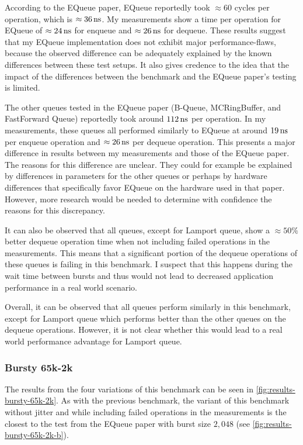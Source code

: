 According to the EQueue paper, EQueue reportedly took $\approx 60$ cycles per operation, which is
$\approx \SI{36}{\nano\second}$.
My measurements show a time per operation for EQueue of $\approx \SI{24}{\nano\second}$ for enqueue and
$\approx \SI{26}{\nano\second}$ for dequeue.
These results suggest that my EQueue implementation does not exhibit major performance-flaws, because the
observed difference can be adequately explained by the known differences between these test setups.
It also gives credence to the idea that the impact of the differences between the benchmark and the EQueue
paper's testing is limited.

The other queues tested in the EQueue paper (B-Queue, MCRingBuffer, and FastForward Queue) reportedly took
around $\SI{112}{\nano\second}$ per operation.
In my measurements, these queues all performed similarly to EQueue at around $\SI{19}{\nano\second}$ per enqueue operation
and $\approx \SI{26}{\nano\second}$ per dequeue operation.
This presents a major difference in results between my measurements and those of the EQueue paper.
The reasons for this difference are unclear.
They could for example be explained by differences in parameters for the other queues or perhaps by hardware
differences that specifically favor EQueue on the hardware used in that paper.
However, more research would be needed to determine with confidence the reasons for this discrepancy.

It can also be observed that all queues, except for Lamport queue, show a $\approx 50\%$ better dequeue
operation time when not including failed operations in the measurements.
This means that a significant portion of the dequeue operations of these queues is failing in this benchmark.
I suspect that this happens during the wait time between bursts and thus would not lead to decreased
application performance in a real world scenario.

Overall, it can be observed that all queues perform similarly in this benchmark, except for Lamport queue
which performs better than the other queues on the dequeue operations.
However, it is not clear whether this would lead to a real world performance advantage for Lamport queue.

\subsubsection{Bursty 65k-2k}
The results from the four variations of this benchmark can be seen in \autoref{fig:results-bursty-65k-2k}.
As with the previous benchmark, the variant of this benchmark without jitter and while including failed
operations in the measurements is the closest to the test from the EQueue paper with burst size $2,048$ (see
\autoref{fig:results-bursty-65k-2k-b}).

